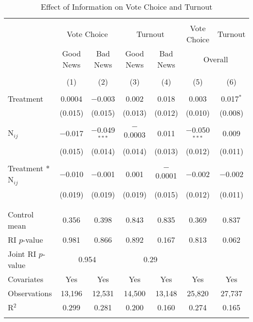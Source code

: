 
\begin{table}[!htbp] \centering 
  \caption{Effect of Information on Vote Choice and Turnout} 
  \label{main_results} 
\begin{tabular}{@{\extracolsep{1pt}}lcccccc} 
\\[-1.8ex]\hline 
\hline \\[-1.8ex] 
 & \multicolumn{2}{c}{Vote Choice}&\multicolumn{2}{c}{Turnout}& Vote Choice & Turnout \\ 
\cline{2-7} 
 & Good News & Bad News & Good News & Bad News & \multicolumn{2}{c}{Overall} \\ 
\\[-1.8ex] & (1) & (2) & (3) & (4) & (5) & (6)\\ 
\hline \\[-1.8ex] 
 Treatment & 0.0004 & $-$0.003 & 0.002 & 0.018 & 0.003 & 0.017$^{*}$ \\ 
  & (0.015) & (0.015) & (0.013) & (0.012) & (0.010) & (0.008) \\ 
  & & & & & & \\ 
 N$_{ij}$ & $-$0.017 & $-$0.049$^{***}$ & $-$0.0003 & 0.011 & $-$0.050$^{***}$ & 0.009 \\ 
  & (0.015) & (0.014) & (0.014) & (0.013) & (0.012) & (0.011) \\ 
  & & & & & & \\ 
 Treatment * N$_{ij}$ & $-$0.010 & $-$0.001 & 0.001 & $-$0.0001 & $-$0.002 & $-$0.002 \\ 
  & (0.019) & (0.019) & (0.019) & (0.015) & (0.012) & (0.011) \\ 
  & & & & & & \\ 
\hline \\[-1.8ex] 
Control mean & 0.356 & 0.398 & 0.843 & 0.835 & 0.369 & 0.837 \\ 
RI $p$-value & 0.981 & 0.866 & 0.892 & 0.167 & 0.813 & 0.062 \\ 
Joint RI $p$-value & \multicolumn{2}{c}{0.954} & \multicolumn{2}{c}{0.29} \\
Covariates & Yes & Yes & Yes & Yes & Yes & Yes \\ 
Observations & 13,196 & 12,531 & 14,500 & 13,148 & 25,820 & 27,737 \\ 
R$^{2}$ & 0.299 & 0.281 & 0.200 & 0.160 & 0.274 & 0.165 \\ 
\hline 
\hline \\[-1.8ex] 
\end{tabular} 

\end{table}
